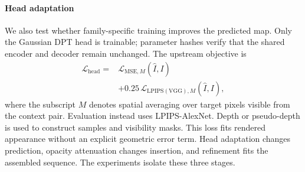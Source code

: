 \paragraph{Head adaptation}
We also test whether family-specific training improves the predicted map.
Only the Gaussian DPT head is trainable; parameter hashes verify that the
shared encoder and decoder remain unchanged. The upstream objective is
\begin{equation}
  \begin{aligned}
  \mathcal L_{\mathrm{head}}={}&
  \mathcal L_{\mathrm{MSE},M}(\hat I,I)\\
  &+0.25\,\mathcal L_{\mathrm{LPIPS(VGG)},M}(\hat I,I),
  \end{aligned}
  \label{eq:head}
\end{equation}
where the subscript $M$ denotes spatial averaging over target pixels visible
from the context pair. Evaluation instead uses LPIPS-AlexNet.
Depth or pseudo-depth is used to construct samples and visibility masks.
This loss fits rendered appearance without an explicit geometric error term.
Head adaptation changes prediction, opacity attenuation changes insertion,
and refinement fits the assembled sequence. The experiments isolate these
three stages.
